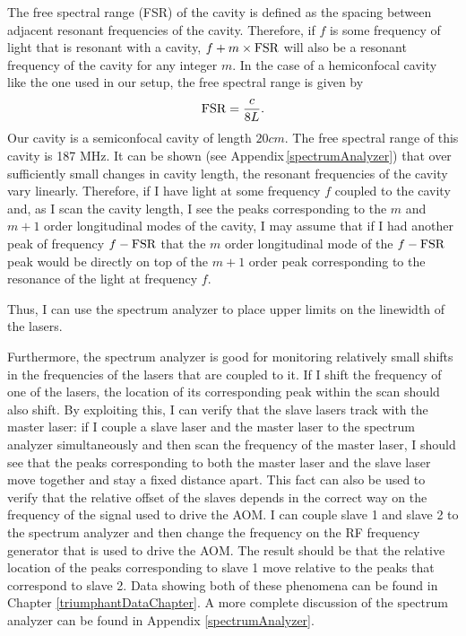The free spectral range (FSR) of the cavity is defined as the spacing between adjacent resonant frequencies of the cavity. Therefore, if $f$ is some frequency of light that is resonant with a cavity, $f+m\times \textnormal{FSR}$ will also be a resonant frequency of the cavity for any integer $m$. In the case of a hemiconfocal cavity like the one used in our setup, the free spectral range is given by 
\begin{equation}
    \textnormal{FSR}=\frac{c}{8L}.
\end{equation}
Our cavity is a semiconfocal cavity of length $20cm$. The free spectral range of this cavity is 187 MHz. 
It can be shown (see Appendix\,\ref{spectrumAnalyzer}) that over sufficiently small changes in cavity length, the resonant frequencies of the cavity vary linearly. 
Therefore, if I have light at some frequency $f$ coupled to the cavity and, as I scan the cavity length, I see the peaks corresponding to the $m$ and $m+1$ order longitudinal modes of the cavity, I may assume that if I had another peak of frequency $f-\textnormal{FSR}$ that the $m$ order longitudinal mode of the $f-\textnormal{FSR}$ peak would be directly on top of the $m+1$ order peak corresponding to the resonance of the light at frequency $f$.



Thus, I can use the spectrum analyzer to place upper limits on the linewidth of the lasers. 

Furthermore, the spectrum analyzer is good for monitoring relatively small shifts in the frequencies of the lasers that are coupled to it. If I shift the frequency of one of the lasers, the location of its corresponding peak within the scan should also shift. 
By exploiting this, I can verify that the slave lasers track with the master laser: if I couple a slave laser and the master laser to the spectrum analyzer simultaneously and then scan the frequency of the master laser, I should see that the peaks corresponding to both the master laser and the slave laser move together and stay a fixed distance apart. 
This fact can also be used to verify that the relative offset of the slaves depends in the correct way on the frequency of the signal used to drive the AOM. I can couple slave 1 and slave 2 to the spectrum analyzer and then change the frequency on the RF frequency generator that is used to drive the AOM. The result should be that the relative location of the peaks corresponding to slave 1 move relative to the peaks that correspond to slave 2. Data showing both of these phenomena can be found in Chapter \ref{triumphantDataChapter}. A more complete discussion of the spectrum analyzer can be found in Appendix \ref{spectrumAnalyzer}. 
